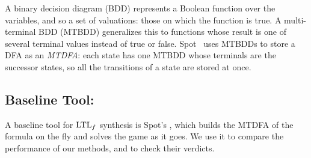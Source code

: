 A binary decision diagram (BDD) represents a Boolean function over the variables, and so a set of valuations: those on which the function is true.
A multi-terminal BDD (MTBDD) generalizes this to functions whose result is one of several terminal values instead of true or false.
Spot~\cite{Spot2022} uses MTBDDs to store a DFA as an \emph{MTDFA}: each state has one MTBDD whose terminals are the successor states, so all the transitions of a state are stored at once.

\subsection{Baseline Tool: }

A baseline tool for $\text{LTL}_f$ synthesis is Spot's , which builds the MTDFA of the formula on the fly and solves the game as it goes.
We use it to compare the performance of our methods, and to check their verdicts.
